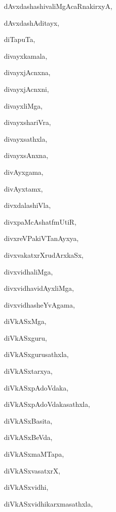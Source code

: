 \begin{multicols}{2}
{dAvxdashashivaliMgAcaRnakirxyA}, \pageref{dAvxdashashivaliMgAcaRnakirxyA}

{dAvxdashAditayx}, \pageref{dAvxdashAditayx}

{diTapuTa}, \pageref{diTapuTa}

{divayxkamala}, \pageref{divayxkamala}

{divayxjAcnxna}, \pageref{divayxjAcnxna}

{divayxjAcnxni}, \pageref{divayxjAcnxni}

{divayxliMga}, \pageref{divayxliMga}

{divayxshariVra}, \pageref{divayxshariVra}

{divayxsathxla}, \pageref{divayxsathxla}

{divayxsAnxna}, \pageref{divayxsAnxna}

{divAyxgama}, \pageref{divAyxgama}

{divAyxtamx}, \pageref{divAyxtamx}

{divxdalashiVla}, \pageref{divxdalashiVla}

{divxpaMcAshatfmUtiR}, \pageref{divxpaMcAshatfmUtiR}

{divxreVPakiVTanAyxya}, \pageref{divxreVPakiVTanAyxya}

{divxvakatxrXrudArxkaSx}, \pageref{divxvakatxrXrudArxkaSx}

{divxvidhaliMga}, \pageref{divxvidhaliMga}

{divxvidhavidAyxliMga}, \pageref{divxvidhavidAyxliMga}

{divxvidhasheYvAgama}, \pageref{divxvidhasheYvAgama}

{diVkASxMga}, \pageref{diVkASxMga}

{diVkASxguru}, \pageref{diVkASxguru}

{diVkASxgurusathxla}, \pageref{diVkASxgurusathxla}

{diVkASxtarxya}, \pageref{diVkASxtarxya}

{diVkASxpAdoVdaka}, \pageref{diVkASxpAdoVdaka}

{diVkASxpAdoVdakasathxla}, \pageref{diVkASxpAdoVdakasathxla}

{diVkASxBasita}, \pageref{diVkASxBasita}

{diVkASxBeVda}, \pageref{diVkASxBeVda}

{diVkASxmaMTapa}, \pageref{diVkASxmaMTapa}

{diVkASxvasatxrX}, \pageref{diVkASxvasatxrX}

{diVkASxvidhi}, \pageref{diVkASxvidhi}

{diVkASxvidhikarxmasathxla}, \pageref{diVkASxvidhikarxmasathxla}


\end{multicols}
